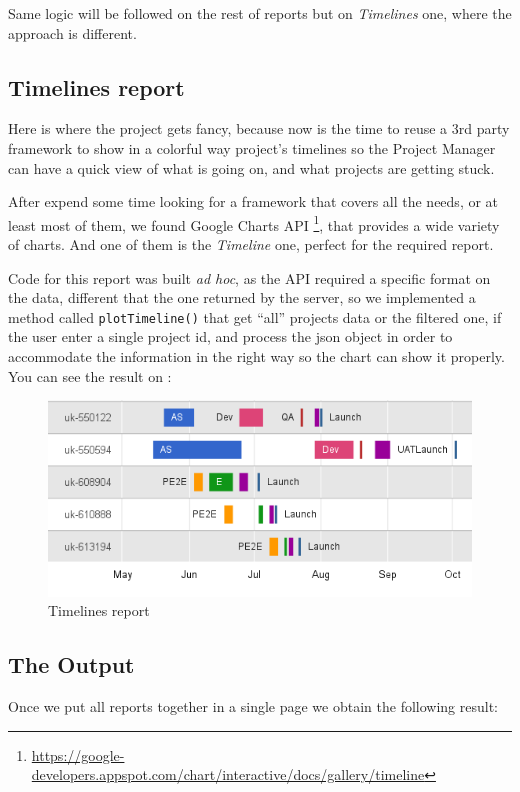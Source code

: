 Same logic will be followed on the rest of reports but on \emph{Timelines} one,
where the approach is different.

\subsection{Timelines report}
Here is where the project gets fancy, because now is the time to reuse a 3rd
party framework to show in a colorful way project's timelines so the Project
Manager can have a quick view of what is going on, and what projects are getting
stuck.

After expend some time looking for a framework that covers all the needs, or at
least most of them, we found Google Charts API
\footnote{\url{https://google-developers.appspot.com/chart/interactive/docs/gallery/timeline}},
that provides a wide variety of charts. And one of them is the \emph{Timeline}
one, perfect for the required report.

Code for this report was built \emph{ad hoc}, as the API required a specific
format on the data, different that the one returned by the server, so we
implemented a method called \texttt{plotTimeline()} that get ``all'' projects data or the
filtered one, if the user enter a single project id, and process the json object
in order to accommodate the information in the right way so the chart can show
it properly. You can see the result on 
:

\begin{figure}[ht!]
	\centering
   	\includegraphics[width=1\textwidth]{./resources/report_timelines_new.png}
   	\caption{Timelines report}
   	\label{f_report_timelines_new}
\end{figure}

\subsection{The Output}
Once we put all reports together in a single page we obtain the following
result:

